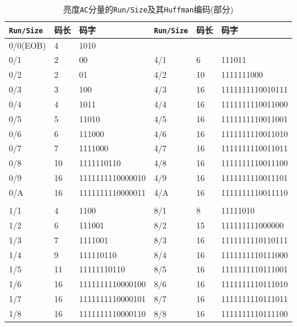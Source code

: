 \documentclass{article}
\numberwithin{figure}{section}
\numberwithin{table}{section}
\numberwithin{listing}{section}
\numberwithin{equation}{section}
\begin{document}
        \begin{table}[H]
            \caption{亮度\texttt{AC}分量的\texttt{Run/Size}及其\texttt{Huffman}编码(部分)}
            \label{tab:AC_Huffman}
            \centering
        
            \begin{tabular}{llllll}
            \hline
        
            \hline
            \textbf{\texttt{Run/Size}} & \textbf{码长} & \textbf{码字} & \textbf{\texttt{Run/Size}} & \textbf{码长} & \textbf{码字} \\
            \hline
                0/0(EOB) & 4 & 1010 & & & \\
                0/1 & 2 & 00 & 4/1 & 6 & 111011 \\
                0/2 & 2 & 01 & 4/2 & 10 & 1111111000 \\
                0/3 & 3 & 100 & 4/3 & 16 & 1111111110010111 \\
                0/4 & 4 & 1011 & 4/4 & 16 & 1111111110011000 \\
                0/5 & 5 & 11010 & 4/5 & 16 & 1111111110011001 \\
                0/6 & 6 & 111000 & 4/6 & 16 & 1111111110011010 \\
                0/7 & 7 & 1111000 & 4/7 & 16 & 1111111110011011 \\
                0/8 & 10 & 1111110110 & 4/8 & 16 & 1111111110011100 \\
                0/9 & 16 & 1111111110000010 & 4/9 & 16 & 1111111110011101 \\
                0/A & 16 & 1111111110000011 & 4/A & 16 & 1111111110011110 \\
                 & & & & & \\
                1/1 & 4 & 1100 & 8/1 & 8 & 11111010 \\
                1/2 & 6 & 111001 & 8/2 & 15 & 111111111000000 \\
                1/3 & 7 & 1111001 & 8/3 & 16 & 1111111110110111 \\
                1/4 & 9 & 111110110 & 8/4 & 16 & 1111111110111000 \\
                1/5 & 11 & 11111110110 & 8/5 & 16 & 1111111110111001 \\
                1/6 & 16 & 1111111110000100 & 8/6 & 16 & 1111111110111010 \\
                1/7 & 16 & 1111111110000101 & 8/7 & 16 & 1111111110111011 \\
                1/8 & 16 & 1111111110000110 & 8/8 & 16 & 1111111110111100 \\

\end{tabular}
\end{table}
\end{document}
